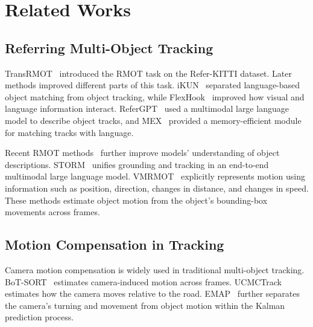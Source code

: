 \documentclass{article}
\providecommand{\DIFdelbegin}{} %
\providecommand{\DIFdelend}{} %
\providecommand{\DIFscaledelfig}{0.5}
\newlength{\DIFdelgraphicswidth} %
\newlength{\DIFdelgraphicsheight} %
\providecommand{\DIFdelincludegraphics}[2][]{%
\sbox{\DIFdelgraphicsbox}{\DIFOincludegraphics[#1]{#2}}%
\settoboxwidth{\DIFdelgraphicswidth}{\DIFdelgraphicsbox} %
\settoboxtotalheight{\DIFdelgraphicsheight}{\DIFdelgraphicsbox} %
\scalebox{\DIFscaledelfig}{%
\parbox[b]{\DIFdelgraphicswidth}{\usebox{\DIFdelgraphicsbox}\\[-\baselineskip] \rule{\DIFdelgraphicswidth}{0em}}\llap{\resizebox{\DIFdelgraphicswidth}{\DIFdelgraphicsheight}{%
\setlength{\unitlength}{\DIFdelgraphicswidth}%
\begin{picture}(1,1)%
\thicklines\linethickness{2pt} %
{\color[rgb]{1,0,0}\put(0,0){\framebox(1,1){}}}%
{\color[rgb]{1,0,0}\put(0,0){\line( 1,1){1}}}%
{\color[rgb]{1,0,0}\put(0,1){\line(1,-1){1}}}%
\end{picture}%
}\hspace*{3pt}}} %
} %
\DeclareRobustCommand{\DIFdelbegin}{\DIFOdelbegin \let\includegraphics\DIFdelincludegraphics} %
\DeclareRobustCommand{\DIFdelend}{\DIFOaddend \let\includegraphics\DIFOincludegraphics} %
\begin{document}
\section{Related Works}
\label{sec:related}
\subsection{Referring Multi-Object Tracking}
TransRMOT~\cite{transrmot} introduced the RMOT task on the Refer-KITTI dataset. Later methods improved different parts of this task. iKUN~\cite{ikun} separated language-based object matching from object tracking, while FlexHook~\cite{flexhook} improved how visual and language information interact. ReferGPT~\cite{refergpt} used a multimodal large language model to describe object tracks, and MEX~\cite{mex} provided a memory-efficient module for matching tracks with language.

Recent RMOT methods~\cite{deeprmot} further improve models' understanding of object descriptions. STORM~\cite{storm} unifies grounding and tracking in an end-to-end multimodal large language model. VMRMOT~\cite{vmrmot} explicitly represents motion using information such as position, direction, changes in distance, and changes in speed. These methods estimate object motion from the object's bounding-box movements across frames.

\DIFdelbegin %

\DIFdelend \subsection{Motion Compensation in Tracking}
Camera motion compensation is widely used in traditional multi-object tracking. BoT-SORT~\cite{botsort} estimates camera-induced motion across frames. UCMCTrack~\cite{ucmctrack} estimates how the camera moves relative to the road. EMAP~\cite{emap} further separates the camera's turning and movement from object motion within the Kalman prediction process.
\end{document}
